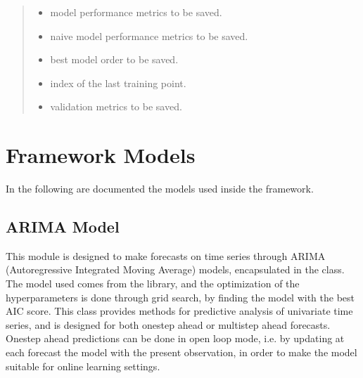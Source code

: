 \documentclass[letterpaper,10pt,english]{sphinxmanual}
\begin{document}
\begin{fulllineitems}
\begin{quote}
\begin{description}
\begin{itemize}
\item {} 
\sphinxAtStartPar
{} \textendash{} model performance metrics to be saved.

\item {} 
\sphinxAtStartPar
{} \textendash{} naive model performance metrics to be saved.

\item {} 
\sphinxAtStartPar
{} \textendash{} best model order to be saved.

\item {} 
\sphinxAtStartPar
{} \textendash{} index of the last training point.

\item {} 
\sphinxAtStartPar
{} \textendash{} validation metrics to be saved.

\end{itemize}

\end{description}\end{quote}

\end{fulllineitems}



\chapter{Framework Models}
\label{\detokenize{index:framework-models}}
\sphinxAtStartPar
In the following are documented the models used inside the framework.

\sphinxstepscope


\section{ARIMA Model}
\label{\detokenize{docs/ARIMA_model:arima-model}}\label{\detokenize{docs/ARIMA_model::doc}}
\sphinxAtStartPar
This module is designed to make forecasts on time series through ARIMA (Autoregressive Integrated Moving Average) models,
encapsulated in the  class. The model used comes from the  library, and the optimization of the hyperparameters
is done through grid search, by finding the model with the best AIC score.
This class provides methods for predictive analysis of univariate time series,
and is designed for both one\sphinxhyphen{}step ahead or multi\sphinxhyphen{}step ahead forecasts.
One\sphinxhyphen{}step ahead predictions can be done in open loop mode, i.e. by updating at
each forecast the model with the present observation,
in order to make the model suitable for online learning settings.
\end{document}
